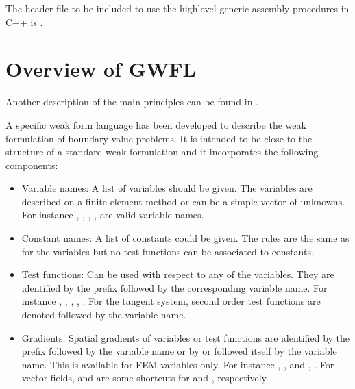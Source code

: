 \documentclass[a4paper,11pt,english]{sphinxmanual}
\begin{document}
The header file to be included to use the high\sphinxhyphen{}level generic assembly procedures in C++ is .


\section{Overview of GWFL}
\label{\detokenize{userdoc/gasm_high:overview-of-gwfl}}
Another description of the main principles can be found in .

A specific weak form language has been developed to describe the weak formulation of boundary value problems. It is intended to be close to the structure of a standard weak formulation and it incorporates the following components:
\begin{itemize}
\item {} 
Variable names: A list of variables should be given. The variables are described on a finite element method or can be a simple vector of unknowns. For instance , , , ,  are valid variable names.

\item {} 
Constant names: A list of constants could be given. The rules are the same as for the variables but no test functions can be associated to constants.

\item {} 
Test functions: Can be used with respect to any of the variables. They are identified by the prefix  followed by the corresponding variable name. For instance  , , , , . For the tangent system, second order test functions are denoted  followed by the variable name.

\item {} 
Gradients: Spatial gradients of variables or test functions are identified by the prefix  followed by the variable name or by  or  followed itself by the variable name. This is available for FEM variables only. For instance , ,  and , . For vector fields,  and  are some shortcuts for  and , respectively.


\end{itemize}
\end{document}
